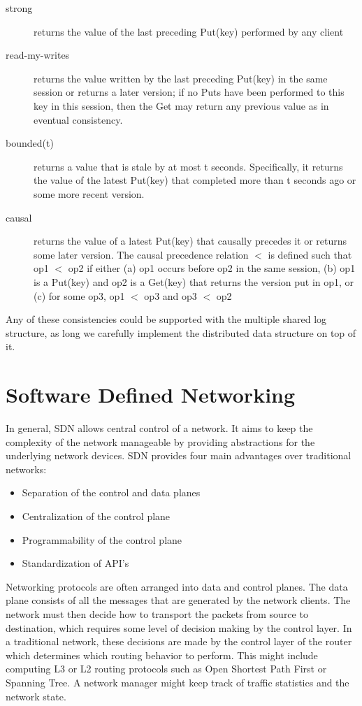 \documentclass[letterpaper,twocolumn,10pt]{article}
\begin{document}
\begin{description}
\item[strong] returns the value of the last preceding Put(key) performed by any client
\item[read-my-writes] returns the value written by the last preceding Put(key) in the same session or returns a later version; if no Puts have been performed to this key in this session, then the Get may return any previous value as in eventual consistency.
\item[bounded(t)] returns a value that is stale by at most t seconds. Specifically, it returns the value of the latest Put(key) that completed more than t seconds ago or some more recent version.
\item[causal] returns the value of a latest Put(key) that causally precedes it or returns some later version. The causal precedence relation $<$ is defined such that op1 $<$ op2 if either
(a) op1 occurs before op2 in the same session,
(b) op1 is a Put(key) and op2 is a Get(key) that
returns the version put in op1, or
(c) for some op3, op1 $<$ op3 and op3 $<$ op2
\end{description}

Any of these consistencies could be supported with the multiple shared log structure, as long we carefully implement the distributed data structure on top of it.

\section{Software Defined Networking}

In general, SDN allows central control of a network. It aims to keep the complexity of the network manageable by providing abstractions for the underlying network devices. SDN provides four main advantages over traditional networks:\cite{jain2013network}

\begin{itemize}
\item Separation of the control and data planes
\item Centralization of the control plane
\item Programmability of the control plane
\item Standardization of API's
\end{itemize}
\cite{SDN}

Networking protocols are often arranged into data and control planes. The data plane consists of all the messages that are generated by the network clients. The network must then decide how to transport the packets from source to destination, which requires some level of decision making by the control layer. In a traditional network, these decisions are made by the control layer of the router which determines which routing behavior to perform. This might include computing L3 or L2
routing protocols such as Open Shortest Path First or Spanning Tree. A network manager might keep track of traffic statistics and the network state.
\end{document}
